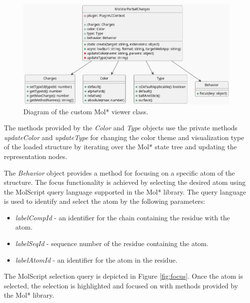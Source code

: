 \documentclass[
  digital,     %
  oneside,     %
  nosansbold,  %
  nocolorbold, %
  lof,         %
  lot,         %
]{fithesis4}
\begin{document}
\begin{figure}[htbp]
  \begin{center}
    \includegraphics[width=\textwidth]{out/figures/uml/viewer/viewer.png}
  \end{center}
  \caption{Diagram of the custom Mol* viewer class.}
  \label{fig:plugin_structure}
\end{figure}

The methods provided by the \textit{Color} and \textit{Type} objects use the private methods \textit{updateColor} and \textit{updateType} for changing the color theme and visualization type of the loaded structure by iterating over the Mol* state tree and updating the representation nodes.

The \textit{Behavior} object provides a method for focusing on a specific atom of the structure. The focus functionality is achieved by selecting the desired atom using the MolScript \cite{kraulis1991molscript} query language supported in the Mol* library. The query language is used to identify and select the atom by the following parameters:

\begin{itemize}
  \item \textit{labelCompId} - an identifier for the chain containing the residue with the atom.
  \item \textit{labelSeqId} - sequence number of the residue containing the atom.
  \item \textit{labelAtomId} - an identifier for the atom in the residue.
\end{itemize}

The MolScript selection query is depicted in Figure \ref{fig:focus}. Once the atom is selected, the selection is highlighted and focused on with methods provided by the Mol* library.
\end{document}
